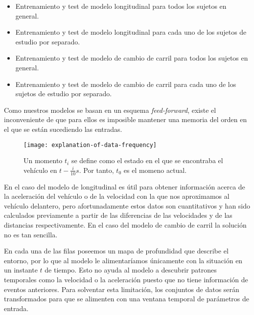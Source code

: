 \begin{itemize}
	\item Entrenamiento y test de modelo longitudinal para todos los sujetos en general.
	\item Entrenamiento y test de modelo longitudinal para cada uno de los sujetos de estudio por separado.
	\item Entrenamiento y test de modelo de cambio de carril para todos los sujetos en general.
	\item Entrenamiento y test de modelo de cambio de carril para cada uno de los sujetos de estudio por separado.
\end{itemize}

Como nuestros modelos se basan en un esquema \textit{feed-forward}, existe el inconveniente de que para ellos es imposible mantener una memoria del orden en el que se están sucediendo las entradas.

\begin{figure*}
	\centering
	\texttt{[image: explanation-of-data-frequency]}
	\caption[Momento $t_i$en el conjunto de datos]{Un momento $t_i$ se define como el estado en el que se encontraba el vehículo en $t - \frac{i}{10}s$. Por tanto, $t_0$ es el momeno actual.}
	\label{fig:moments-illustration}
\end{figure*}

En el caso del modelo de longitudinal es útil para obtener información acerca de la aceleración del vehículo o de la velocidad con la que nos aproximamos al vehículo delantero, pero afortunadamente estos datos son cuantitativos y han sido calculados previamente a partir de las diferencias de las velocidades y de las distancias respectivamente. En el caso del modelo de cambio de carril la solución no es tan sencilla.

En cada una de las filas poseemos un mapa de profundidad que describe el entorno, por lo que al modelo le alimentaríamos únicamente con la situación en un instante $t$ de tiempo. Esto no ayuda al modelo a descubrir patrones temporales como la velocidad o la aceleración puesto que no tiene información de eventos anteriores. Para solventar esta limitación, los conjuntos de datos serán transformados para que se alimenten con una ventana temporal de parámetros de entrada.

